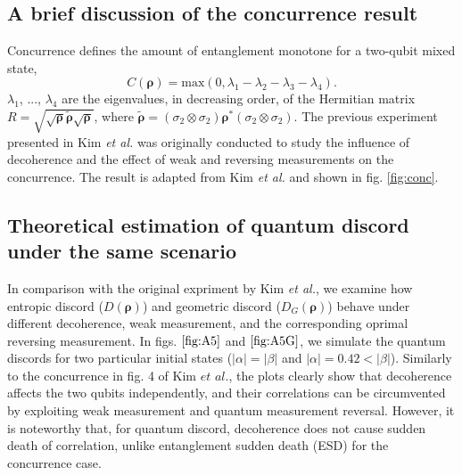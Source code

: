 \documentclass[%
 reprint,
 amsmath,amssymb,
 aps,
]{revtex4-1}
\begin{document}
\subsection{A brief discussion of the concurrence result}
\noindent Concurrence defines the amount of entanglement monotone for a two-qubit mixed state,
\begin{equation}
\textit{C}(\boldsymbol{\rho}) = \text{max}(0, \lambda_1-\lambda_2-\lambda_3-\lambda_4) \text{.}
\end{equation}
\noindent $\lambda_1$, ..., $\lambda_4$ are the eigenvalues, in decreasing order, of the Hermitian matrix $R=\sqrt{\sqrt{\boldsymbol{\rho}}\tilde{\boldsymbol{\rho}}\sqrt{\boldsymbol{\rho}}}$, where $\tilde{\boldsymbol{\rho}} = (\sigma_2 \otimes \sigma_2)\boldsymbol{\rho}^* (\sigma_2 \otimes \sigma_2)$. The previous experiment presented in Kim \textit{et al.} was originally conducted to study the influence of decoherence and the effect of weak and reversing measurements on the concurrence. The result is adapted from Kim \textit{et al.} and shown in fig. \ref{fig:conc}.

\subsection{Theoretical estimation of quantum discord under the same scenario}
\noindent In comparison with the original expriment by Kim \textit{et al.}, we examine how entropic discord ($\textit{D}(\boldsymbol{\rho})$) and geometric discord ($\textit{D}_G(\boldsymbol{\rho})$) behave under different decoherence, weak measurement, and the corresponding oprimal reversing measurement. In figs. $\ref{fig:A5}$ and $\ref{fig:A5G}$, we simulate the quantum discords for two particular initial states ($|\alpha|=|\beta|$ and $|\alpha|=0.42<|\beta|$). Similarly to the concurrence in fig. 4 of Kim $\textit{et al.}$, the plots clearly show that decoherence affects the two qubits independently, and their correlations can be circumvented by exploiting weak measurement and quantum measurement reversal. However, it is noteworthy that, for quantum discord, decoherence does not cause sudden death of correlation, unlike entanglement sudden death (ESD) for the concurrence case.
\end{document}
